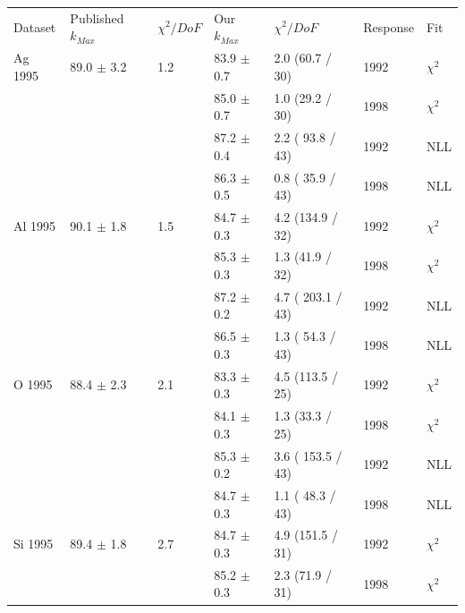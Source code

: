 \begin{table}[h]
  \begin{center}
    \begin{tabular}{|l||l|l|l|l|l|l|}
      \hline
      Dataset & Published $k_{Max}$ & $\chi^2 / DoF$ & Our $k_{Max}$ & $\chi^2 / DoF$  & Response & Fit \\
      \hhline{|=||=|=|=|=|=|=|}
       Ag 1995   & 89.0 $\pm$ 3.2 & 1.2 &83.9 $\pm$ 0.7 &  2.0 (60.7 / 30)  & 1992 & $\chi^2$ \\  
                 &                &     &85.0 $\pm$ 0.7 &  1.0 (29.2 / 30)  & 1998 & $\chi^2$ \\  
                                                                             
                &                &     & 87.2 $\pm$ 0.4 & 2.2 ( 93.8 / 43) & 1992 & NLL \\
                &                &     & 86.3 $\pm$ 0.5 & 0.8 ( 35.9 / 43) & 1998 & NLL \\      
      \hline                                                                
       Al 1995   & 90.1 $\pm$ 1.8 & 1.5 &84.7 $\pm$ 0.3 &  4.2 (134.9 / 32) & 1992 & $\chi^2$ \\  
                 &                &     &85.3 $\pm$ 0.3 &  1.3 (41.9 / 32)  & 1998 & $\chi^2$ \\  
                                                                            
                &                &     & 87.2 $\pm$ 0.2 & 4.7 ( 203.1 / 43) & 1992 & NLL \\
                &                &     & 86.5 $\pm$ 0.3 & 1.3 ( 54.3 / 43) & 1998 & NLL \\
      \hline                                                                
       O 1995    & 88.4 $\pm$ 2.3 & 2.1 &83.3 $\pm$ 0.3 &  4.5 (113.5 / 25) & 1992 & $\chi^2$ \\  
                 &                &     &84.1 $\pm$ 0.3 &  1.3 (33.3 / 25)  & 1998 & $\chi^2$ \\  
                                                                            
                &                &     & 85.3 $\pm$ 0.2 & 3.6 ( 153.5 / 43)& 1992 & NLL\\
                &                &     & 84.7 $\pm$ 0.3 & 1.1 ( 48.3 / 43) & 1998 & NLL\\
      \hline                                                                     
       Si 1995   & 89.4 $\pm$ 1.8 & 2.7 &84.7 $\pm$ 0.3 &  4.9 (151.5 / 31) & 1992 & $\chi^2$ \\  
                 &                &     &85.2 $\pm$ 0.3 &  2.3 (71.9 / 31)  & 1998 & $\chi^2$ \\  
                                                                             

\end{tabular}
\end{center}
\end{table}
